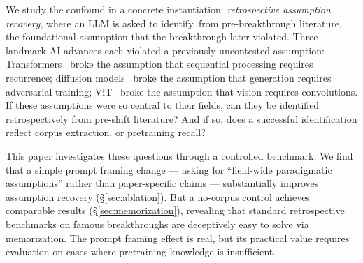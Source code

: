 \documentclass[11pt]{article}
\begin{document}
We study the confound in a concrete instantiation: \emph{retrospective assumption recovery}, where an LLM is asked to identify, from pre-breakthrough literature, the foundational assumption that the breakthrough later violated. Three landmark AI advances each violated a previously-uncontested assumption: Transformers~\cite{vaswani2017attention} broke the assumption that sequential processing requires recurrence; diffusion models~\cite{ho2020denoising} broke the assumption that generation requires adversarial training; ViT~\cite{dosovitskiy2021image} broke the assumption that vision requires convolutions. If these assumptions were so central to their fields, can they be identified retrospectively from pre-shift literature? And if so, does a successful identification reflect corpus extraction, or pretraining recall?

This paper investigates these questions through a controlled benchmark. We find that a simple prompt framing change --- asking for ``field-wide paradigmatic assumptions'' rather than paper-specific claims --- substantially improves assumption recovery (\S\ref{sec:ablation}). But a no-corpus control achieves comparable results (\S\ref{sec:memorization}), revealing that standard retrospective benchmarks on famous breakthroughs are deceptively easy to solve via memorization. The prompt framing effect is real, but its practical value requires evaluation on cases where pretraining knowledge is insufficient.
\end{document}

